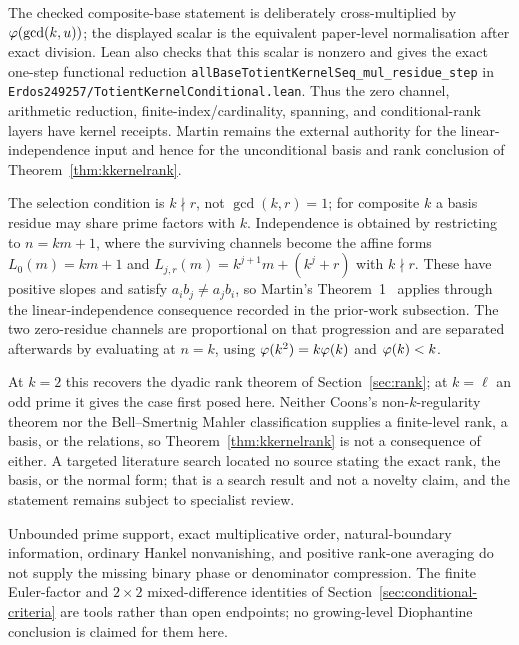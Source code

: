 \documentclass[11pt]{article}
\begin{document}
The checked composite-base statement is deliberately cross-multiplied by
$\varphi(\gcd(k,u))$; the displayed scalar is the equivalent paper-level
normalisation after exact division.  Lean also checks that this scalar is
nonzero and gives the exact one-step functional reduction
\texttt{allBaseTotientKernelSeq\_mul\_residue\_step} in
\texttt{Erdos249257/TotientKernelConditional.lean}.
Thus the zero channel, arithmetic reduction, finite-index/cardinality,
spanning, and conditional-rank layers have kernel receipts.  Martin remains
the external authority for the linear-independence input and hence for the
unconditional basis and rank conclusion of Theorem~\ref{thm:kkernelrank}.

The selection condition is $k\nmid r$, not $\gcd(k,r)=1$; for composite $k$ a
basis residue may share prime factors with $k$.  Independence is obtained by
restricting to $n=km+1$, where the surviving channels become the affine forms
$L_0(m)=km+1$ and $L_{j,r}(m)=k^{j+1}m+(k^j+r)$ with $k\nmid r$.  These have
positive slopes and satisfy $a_ib_j\neq a_jb_i$, so Martin's
Theorem~1~\cite{martin-phi-inequalities} applies through the linear-independence
consequence recorded in the prior-work subsection.  The two zero-residue channels
are proportional on that progression and are separated afterwards by evaluating
at $n=k$, using $\varphi(k^2)=k\varphi(k)$ and $\varphi(k)<k$.

At $k=2$ this recovers the dyadic rank theorem of Section~\ref{sec:rank}; at
$k=\ell$ an odd prime it gives the case first posed here.  Neither Coons's
non-$k$-regularity theorem nor the Bell--Smertnig Mahler classification supplies
a finite-level rank, a basis, or the relations, so
Theorem~\ref{thm:kkernelrank} is not a consequence of either.  A targeted
literature search located no source stating the exact rank, the basis, or the
normal form; that is a search result and not a novelty claim, and the statement
remains subject to specialist review.

\begin{remark}
Unbounded prime support, exact multiplicative order, natural-boundary
information, ordinary Hankel nonvanishing, and positive rank-one averaging do
not supply the missing binary phase or denominator compression.  The finite
Euler-factor and $2\times2$ mixed-difference identities of
Section~\ref{sec:conditional-criteria} are tools rather than open endpoints; no
growing-level Diophantine conclusion is claimed for them here.
\end{remark}
\end{document}
